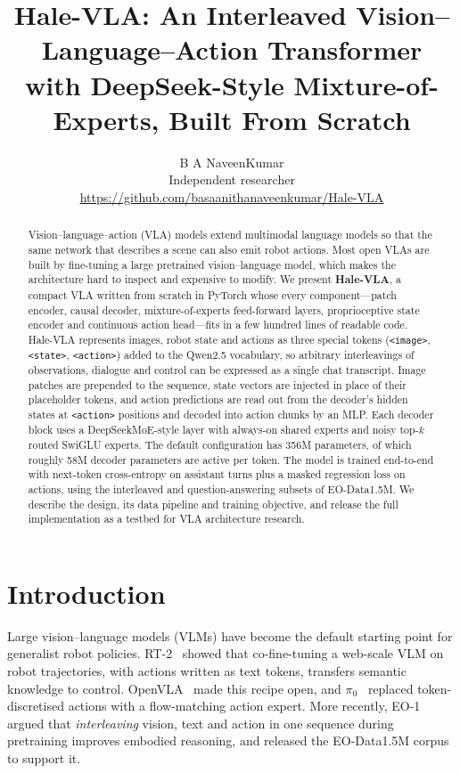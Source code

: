 \documentclass[11pt]{article}
\title{\textbf{Hale-VLA: An Interleaved Vision--Language--Action Transformer\\with DeepSeek-Style Mixture-of-Experts, Built From Scratch}}
\author{B A NaveenKumar\\
\small Independent researcher\\
\small \url{https://github.com/basaanithanaveenkumar/Hale-VLA}}
\date{}
\newcommand{\tok}[1]{\texttt{<#1>}}
\begin{document}
\maketitle

\begin{abstract}
Vision--language--action (VLA) models extend multimodal language models so that the same
network that describes a scene can also emit robot actions. Most open VLAs are built by
fine-tuning a large pretrained vision--language model, which makes the architecture hard to
inspect and expensive to modify. We present \textbf{Hale-VLA}, a compact VLA written from
scratch in PyTorch whose every component---patch encoder, causal decoder, mixture-of-experts
feed-forward layers, proprioceptive state encoder and continuous action head---fits in a few
hundred lines of readable code. Hale-VLA represents images, robot state and actions as three
special tokens (\tok{image}, \tok{state}, \tok{action}) added to the Qwen2.5 vocabulary, so
arbitrary interleavings of observations, dialogue and control can be expressed as a single
chat transcript. Image patches are prepended to the sequence, state vectors are injected in
place of their placeholder tokens, and action predictions are read out from the decoder's
hidden states at \tok{action} positions and decoded into action chunks by an MLP. Each decoder
block uses a DeepSeekMoE-style layer with always-on shared experts and noisy top-$k$ routed
SwiGLU experts. The default configuration has 356M parameters, of which roughly 58M decoder
parameters are active per token. The model is trained end-to-end with next-token
cross-entropy on assistant turns plus a masked regression loss on actions, using the
interleaved and question-answering subsets of EO-Data1.5M. We describe the design, its data
pipeline and training objective, and release the full implementation as a testbed for VLA
architecture research.
\end{abstract}

\section{Introduction}

Large vision--language models (VLMs) have become the default starting point for generalist
robot policies. RT-2~\cite{brohan2023rt2} showed that co-fine-tuning a web-scale VLM on robot
trajectories, with actions written as text tokens, transfers semantic knowledge to control.
OpenVLA~\cite{kim2024openvla} made this recipe open, and $\pi_0$~\cite{black2024pi0} replaced
token-discretised actions with a flow-matching action expert. More recently,
EO-1~\cite{qu2025eo1} argued that \emph{interleaving} vision, text and action in one sequence
during pretraining improves embodied reasoning, and released the EO-Data1.5M corpus to
support it.
\end{document}

